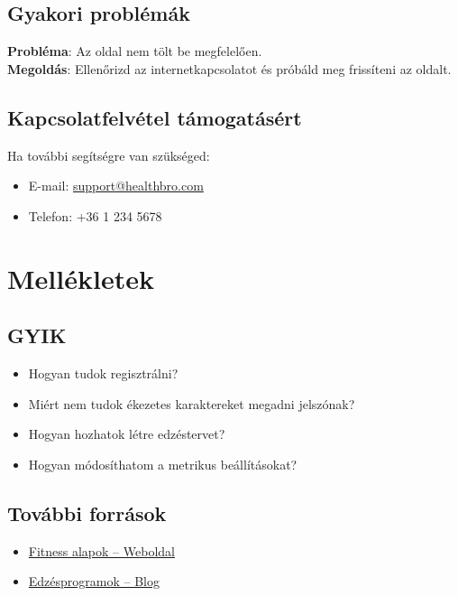 \documentclass[colorlinks]{thesis-kando}
\theoremstyle{definition}
\theoremstyle{remark}
\begin{document}
\section{Gyakori problémák}
\textbf{Probléma}: Az oldal nem tölt be megfelelően.\\
\textbf{Megoldás}: Ellenőrizd az internetkapcsolatot és próbáld meg frissíteni az oldalt.

\section{Kapcsolatfelvétel támogatásért}
Ha további segítségre van szükséged:
\begin{itemize}
	\item E-mail: \href{mailto:support@healthbro.com}{support@healthbro.com}
	\item Telefon: +36 1 234 5678
\end{itemize}

\chapter{Mellékletek}
\section{GYIK}
\begin{itemize}
	\item Hogyan tudok regisztrálni?
	\item Miért nem tudok ékezetes karaktereket megadni jelszónak?
	\item Hogyan hozhatok létre edzéstervet?
	\item Hogyan módosíthatom a metrikus beállításokat?
	
\end{itemize}

\section{További források}
\begin{itemize}
	\item \href{https://www.fitnessalapok.com}{Fitness alapok – Weboldal}
	\item \href{https://www.healthbro.com/blog}{Edzésprogramok – Blog}
\end{itemize}
\end{document}
